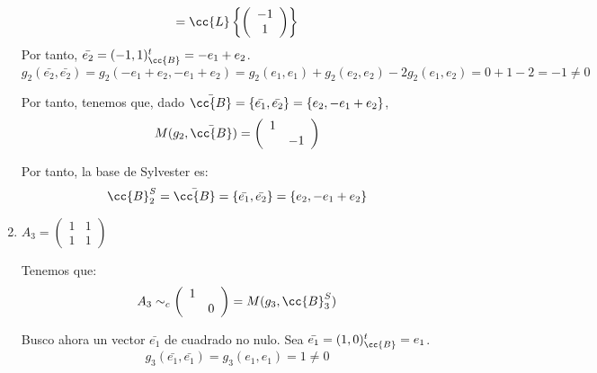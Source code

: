 \begin{ejercicio}
\begin{enumerate}
\begin{equation*}
\begin{split}
            = \cc{L} \left\{ \left(\begin{array}{c}
                 -1 \\ 1
            \end{array} \right) \right\}
        \end{split}\end{equation*}
        Por tanto, $\bar{e_2} = (-1,1)^t_\cc{B} = -e_1+e_2$.
        \begin{equation*}
            g_2(\bar{e_2}, \bar{e_2}) = g_2(-e_1+e_2, -e_1+e_2) = g_2(e_1,e_1) + g_2(e_2,e_2) - 2g_2(e_1, e_2) = 0+1-2=-1 \neq 0
        \end{equation*}

        Por tanto, tenemos que, dado $\bar{\cc{B}} = \{\bar{e_1},\bar{e_2}\} = \{e_2, -e_1+e_2\}$,
        \begin{equation*}
            M(g_2, \bar{\cc{B}}) = \left(\begin{array}{cc}
            1 &  \\
             & -1
        \end{array} \right)
        \end{equation*}

        Por tanto, la base de Sylvester es:
        \begin{equation*}
            \cc{B}_2^S = \bar{\cc{B}} = \{\bar{e_1},\bar{e_2}\} = \{e_2, -e_1+e_2\}
        \end{equation*}

        \item $A_3=\left(\begin{array}{cc}
            1 & 1 \\
            1 & 1
        \end{array} \right)$
        
        Tenemos que:
        \begin{equation*}
            A_3 \sim_c \left(\begin{array}{cc}
                1 &  \\
                & 0
            \end{array} \right) = M(g_3, \cc{B}_{3}^S)
        \end{equation*}
        
        Busco ahora un vector $\bar{e_1}$ de cuadrado no nulo. Sea $\bar{e_1} = (1,0)^t_{\cc{B}} = e_1$.
        \begin{equation*}
            g_3(\bar{e_1}, \bar{e_1}) =
            g_3(e_1, e_1) = 1 \neq 0
        \end{equation*}


\end{enumerate}
\end{ejercicio}
